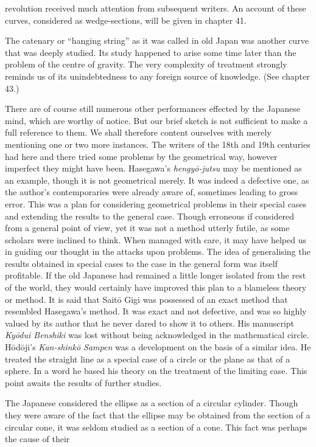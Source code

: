 \documentclass[11pt]{article}
\newcommand{\scanpage}[2]{\clearpage\setcounter{footnote}{0}\noindent{\footnotesize\color{gray}PDF page #1 · #2}\par\medskip}
\newcommand{\scanfooter}{}
\begin{document}
\scanpage{0190}{Chapter 22, printed page 176}
revolution received much attention from subsequent writers. An account of these curves, considered as wedge-sections, will be given in chapter 41.

The catenary or ``hanging string'' as it was called in old Japan was another curve that was deeply studied. Its study happened to arise some time later than the problem of the centre of gravity. The very complexity of treatment strongly reminds us of its unindebtedness to any foreign source of knowledge. (See chapter 43.)

There are of course still numerous other performances effected by the Japanese mind, which are worthy of notice. But our brief sketch is not sufficient to make a full reference to them. We shall therefore content ourselves with merely mentioning one or two more instances. The writers of the 18th and 19th centuries had here and there tried some problems by the geometrical way, however imperfect they might have been. Hasegawa's \emph{hengyō-jutsu} may be mentioned as an example, though it is not geometrical merely. It was indeed a defective one, as the author's contemporaries were already aware of, sometimes leading to gross error. This was a plan for considering geometrical problems in their special cases and extending the results to the general case. Though erroneous if considered from a general point of view, yet it was not a method utterly futile, as some scholars were inclined to think. When managed with care, it may have helped us in guiding our thought in the attacks upon problems. The idea of generalising the results obtained in special cases to the case in the general form was itself profitable. If the old Japanese had remained a little longer isolated from the rest of the world, they would certainly have improved this plan to a blameless theory or method. It is said that Saitō Gigi was possessed of an exact method that resembled Hasegawa's method. It was exact and not defective, and was so highly valued by its author that he never dared to show it to others. His manuscript \emph{Kyōdui Benshiki} was lost without being acknowledged in the mathematical circle. Hōdōji's \emph{Kan-shinkō Sampen} was a development on the basis of a similar idea. He treated the straight line as a special case of a circle or the plane as that of a sphere. In a word he based his theory on the treatment of the limiting case. This point awaits the results of further studies.

The Japanese considered the ellipse as a section of a circular cylinder. Though they were aware of the fact that the ellipse may be obtained from the section of a circular cone, it was seldom studied as a section of a cone. This fact was perhaps the cause of their
\scanfooter
\end{document}
